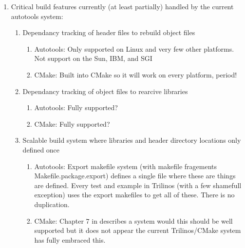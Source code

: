 \documentclass[pdf,ps2pdf,11pt]{SANDreport}
\begin{document}
\begin{enumerate}

{}\item Critical build features currently (at least partially) handled
by the current autotools system:

  \begin{enumerate}

  {}\item Dependancy tracking of header files to rebuild object files

    \begin{enumerate}

    {}\item Autotools: Only supported on Linux and very few other
    platforms.  Not support on the Sun, IBM, and SGI

    {}\item CMake: Built into CMake so it will work on every platform,
    period!

    \end{enumerate}

  {}\item Dependancy tracking of object files to rearcive libraries

    \begin{enumerate}

    {}\item Autotools: Fully supported?

    {}\item CMake: Fully supported?

    \end{enumerate}

  {}\item Scalable build system where libraries and header directory
  locations only defined once

    \begin{enumerate}

    {}\item Autotools: Export makefile system (with makefile
    fragements Makefile.package.export) defines a single file where
    these are things are defined.  Every test and example in Trilinos
    (with a few shamefull exception) uses the export makefiles to get
    all of these.  There is no duplication.

    {}\item CMake: Chapter 7 in {}\cite{MasteringCMake_fourth}
    describes a system would this should be well supported but it does
    not appear the current Trilinos/CMake system has fully embraced
    this.


\end{enumerate}
\end{enumerate}
\end{enumerate}
\end{document}
